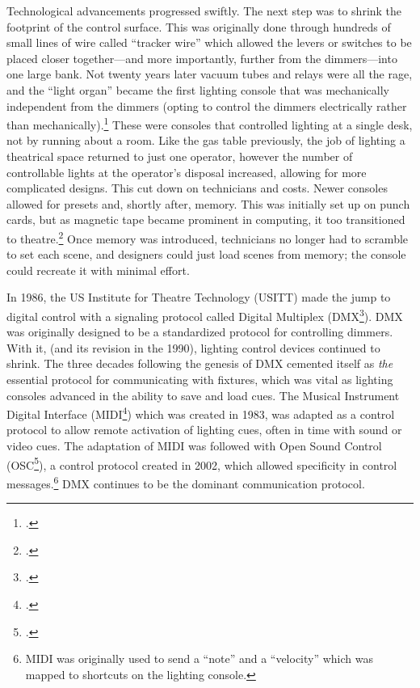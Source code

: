 \documentclass[
    12pt,
    twoside,
    bibstyle=chicago,
    headerstyle=uppercase,
	bibfile=biblatex_updating.bib
]{reedthesis}
\begin{document}
Technological advancements progressed swiftly. The next step was to shrink the footprint of the control surface. This was originally done through hundreds of small lines of wire called “tracker wire” which allowed the levers or switches to be placed closer together---and more importantly, further from the dimmers---into one large bank. Not twenty years later vacuum tubes and relays were all the rage, and the “light organ” became the first lighting console that was mechanically independent from the dimmers (opting to control the dimmers electrically rather than mechanically).\footcite[480]{kellerLightFantasticArt2006} These were consoles that controlled lighting at a single desk, not by running about a room. Like the gas table previously, the job of lighting a theatrical space returned to just one operator, however the number of controllable lights at the operator's disposal increased, allowing for more complicated designs. This cut down on technicians and costs. Newer consoles allowed for presets and, shortly after, memory. This was initially set up on punch cards, but as magnetic tape became prominent in computing, it too transitioned to theatre.\footcite[481]{kellerLightFantasticArt2006} Once memory was introduced, technicians no longer had to scramble to set each scene, and designers could just load scenes from memory; the console could recreate it with minimal effort.

In 1986, the US Institute for Theatre Technology (USITT) made the jump to digital control with a signaling protocol called Digital Multiplex (DMX\footcite{EntertainmentTechnologyUSITT2024}). DMX was originally designed to be a standardized protocol for controlling dimmers. With it, (and its revision in the 1990), lighting control devices continued to shrink. The three decades following the genesis of DMX cemented itself as \textit{the} essential protocol for communicating with fixtures, which was vital as lighting consoles advanced in the ability to save and load cues. The Musical Instrument Digital Interface (MIDI\footcite{MIDIShowControl}) which was created in 1983, was adapted as a control protocol to allow remote activation of lighting cues, often in time with sound or video cues. The adaptation of MIDI was followed with Open Sound Control (OSC\footcite{OSCSpecification102021}), a control protocol created in 2002, which allowed specificity in control messages.\footnote{MIDI was originally used to send a ``note'' and a ``velocity'' which was mapped to shortcuts on the lighting console.} DMX continues to be the dominant communication protocol.
\end{document}
